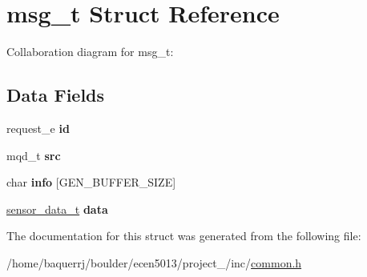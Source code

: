 \hypertarget{structmsg__t}{}\section{msg\+\_\+t Struct Reference}
\label{structmsg__t}


Collaboration diagram for msg\+\_\+t\+:
\subsection*{Data Fields}
\begin{DoxyCompactItemize}
\item 
\mbox{\label{structmsg__t_a565af98d429e30427c0efd1795aae05b}} 
request\+\_\+e {\bfseries id}
\item 
\mbox{\label{structmsg__t_a84037d413252e2826c708b8c73c56861}} 
mqd\+\_\+t {\bfseries src}
\item 
\mbox{\label{structmsg__t_a93bd354add3c2911fe64887580c67506}} 
char {\bfseries info} \mbox{[}G\+E\+N\+\_\+\+B\+U\+F\+F\+E\+R\+\_\+\+S\+I\+ZE\mbox{]}
\item 
\mbox{\label{structmsg__t_a0f1c46dc89615575fb264a45c86c3f37}} 
\hyperlink{structsensor__data__t}{sensor\+\_\+data\+\_\+t} {\bfseries data}
\end{DoxyCompactItemize}


The documentation for this struct was generated from the following file\+:\begin{DoxyCompactItemize}
\item 
/home/baquerrj/boulder/ecen5013/project\+\_/inc/\hyperlink{common_8h}{common.\+h}\end{DoxyCompactItemize}
